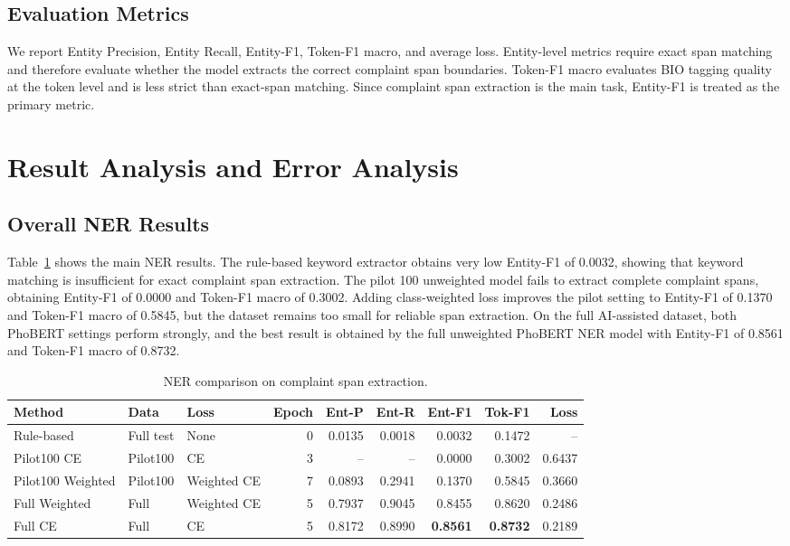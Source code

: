 \documentclass[11pt]{article}
\begin{document}
\subsection{Evaluation Metrics}

We report Entity Precision, Entity Recall, Entity-F1, Token-F1 macro, and average loss. Entity-level metrics require exact span matching and therefore evaluate whether the model extracts the correct complaint span boundaries. Token-F1 macro evaluates BIO tagging quality at the token level and is less strict than exact-span matching. Since complaint span extraction is the main task, Entity-F1 is treated as the primary metric.

\section{Result Analysis and Error Analysis}

\subsection{Overall NER Results}

Table~\ref{tab:ner-results-new} shows the main NER results. The rule-based keyword extractor obtains very low Entity-F1 of 0.0032, showing that keyword matching is insufficient for exact complaint span extraction. The pilot 100 unweighted model fails to extract complete complaint spans, obtaining Entity-F1 of 0.0000 and Token-F1 macro of 0.3002. Adding class-weighted loss improves the pilot setting to Entity-F1 of 0.1370 and Token-F1 macro of 0.5845, but the dataset remains too small for reliable span extraction.
On the full AI-assisted dataset, both PhoBERT settings perform strongly, and the best result is obtained by the full unweighted PhoBERT NER model with Entity-F1 of 0.8561 and Token-F1 macro of 0.8732.

\begin{table}[t]
\centering
\small
\setlength{\tabcolsep}{3pt}
\begin{tabular}{lllrrrrrr}
\toprule
Method & Data & Loss & Epoch & Ent-P & Ent-R & Ent-F1 & Tok-F1 & Loss \\
\midrule
Rule-based & Full test & None & 0 & 0.0135 & 0.0018 & 0.0032 & 0.1472 & -- \\
Pilot100 CE & Pilot100 & CE & 3 & -- & -- & 0.0000 & 0.3002 & 0.6437 \\
Pilot100 Weighted & Pilot100 & Weighted CE & 7 & 0.0893 & 0.2941 & 0.1370 & 0.5845 & 0.3660 \\
Full Weighted & Full & Weighted CE & 5 & 0.7937 & 0.9045 & 0.8455 & 0.8620 & 0.2486 \\
Full CE & Full & CE & 5 & 0.8172 & 0.8990 & \textbf{0.8561} & \textbf{0.8732} & 0.2189 \\
\bottomrule
\end{tabular}
\caption{NER comparison on complaint span extraction.}
\label{tab:ner-results-new}
\end{table}
\end{document}
